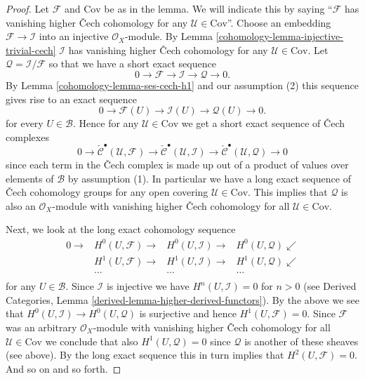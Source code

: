 \begin{proof}

Let $\mathcal{F}$ and $\text{Cov}$ be as in the lemma.
We will indicate this by saying ``$\mathcal{F}$ has vanishing higher
{\v C}ech cohomology for any $\mathcal{U} \in \text{Cov}$''.
Choose an embedding $\mathcal{F} \to \mathcal{I}$ into an
injective $\mathcal{O}_X$-module.
By Lemma \ref{cohomology-lemma-injective-trivial-cech} $\mathcal{I}$
has vanishing higher {\v C}ech cohomology for any $\mathcal{U} \in \text{Cov}$.
Let $\mathcal{Q} = \mathcal{I}/\mathcal{F}$
so that we have a short exact sequence
$$
0 \to \mathcal{F} \to \mathcal{I} \to \mathcal{Q} \to 0.
$$
By Lemma \ref{cohomology-lemma-ses-cech-h1} and our assumption (2)
this sequence gives rise to an exact sequence
$$
0 \to \mathcal{F}(U) \to \mathcal{I}(U) \to \mathcal{Q}(U) \to 0.
$$
for every $U \in \mathcal{B}$. Hence for any $\mathcal{U} \in \text{Cov}$
we get a short exact sequence of {\v C}ech complexes
$$
0 \to
\check{\mathcal{C}}^\bullet(\mathcal{U}, \mathcal{F}) \to
\check{\mathcal{C}}^\bullet(\mathcal{U}, \mathcal{I}) \to
\check{\mathcal{C}}^\bullet(\mathcal{U}, \mathcal{Q}) \to 0
$$
since each term in the {\v C}ech complex is made up out of a product of
values over elements of $\mathcal{B}$ by assumption (1).
In particular we have a long exact sequence of {\v C}ech cohomology
groups for any open covering $\mathcal{U} \in \text{Cov}$.
This implies that $\mathcal{Q}$ is also an $\mathcal{O}_X$-module
with vanishing higher {\v C}ech cohomology for all
$\mathcal{U} \in \text{Cov}$.

\medskip\noindent
Next, we look at the long exact cohomology sequence
$$
\begin{array}{cccc}0 \longrightarrow & H^0(U, \mathcal{F}) \longrightarrow & H^0(U, \mathcal{I}) \longrightarrow & H^0(U, \mathcal{Q}) \swarrow \\  & H^1(U, \mathcal{F}) \longrightarrow & H^1(U, \mathcal{I}) \longrightarrow & H^1(U, \mathcal{Q}) \swarrow \\  & \ldots & \ldots & \ldots \\  &  &  & \end{array}
$$
for any $U \in \mathcal{B}$. Since $\mathcal{I}$ is injective we
have $H^n(U, \mathcal{I}) = 0$ for $n > 0$ (see
Derived Categories, Lemma \ref{derived-lemma-higher-derived-functors}).
By the above we see that $H^0(U, \mathcal{I}) \to H^0(U, \mathcal{Q})$
is surjective and hence $H^1(U, \mathcal{F}) = 0$.
Since $\mathcal{F}$ was an arbitrary $\mathcal{O}_X$-module with
vanishing higher {\v C}ech cohomology for all $\mathcal{U} \in \text{Cov}$
we conclude that also $H^1(U, \mathcal{Q}) = 0$ since $\mathcal{Q}$ is
another of these sheaves (see above). By the long exact sequence this in
turn implies that $H^2(U, \mathcal{F}) = 0$. And so on and so forth.
\end{proof}

